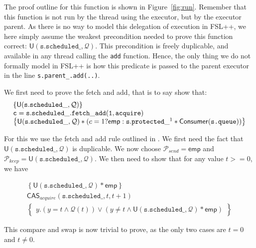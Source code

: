 The proof outline for this function is shown in Figure~\ref{fig:run}. Remember that this function is not run by the thread using the executor, but by the executor parent. As there is no way to model this delegation of execution in FSL++, we here simply assume the weakest precondition needed to prove this function correct: $\mathsf{U}(\mathtt{s.scheduled\_}, \mathcal{Q})$. This precondition is freely duplicable, and available in any thread calling the \texttt{add} function. Hence, the only thing we do not formally model in FSL++ is how this predicate is passed to the parent executor in the line \texttt{s.parent\_.add(..)}. 

We first need to prove the fetch and add, that is to say show that:
\begin{equation*}
		\begin{array}{l}
	\left\{\mathsf{U}(\mathtt{s.scheduled\_}, \mathcal{Q}) \right\} \\
		\mathtt{c = s.scheduled\_.fetch\_add(1, acquire)} \\
		\left\{\mathsf{U}(\mathtt{s.scheduled\_}, \mathcal{Q}) * (c = 1 ? \mathsf{emp} :  \mathtt{s.protected\_}^1 * \mathsf{Consumer}(\texttt{s.queue})) \right\}
\end{array}
\end{equation*}

For this we use the fetch and add rule outlined in \cite{fsl}. We first need the fact that $\mathsf{U}(\mathtt{s.scheduled\_}, \mathcal{Q})$ is duplicable. We now choose $\mathcal{P}_{send} = \mathsf{emp}$ and $\mathcal{P}_{keep} = \mathsf{U}(\mathtt{s.scheduled\_}, \mathcal{Q})$. We then need to show that for any value $t >= 0$, we have

\begin{equation*}
		\begin{array}{l}
		\left\{ \mathsf{U}(\mathtt{s.scheduled\_}, \mathcal{Q}) * \mathsf{emp}
		\right\}\\
				\mathsf{CAS}_{acquire}(\mathtt{s.scheduled\_}, t, t + 1) \\
		\left\{
				\begin{array}{l}
						y. (y = t \land \mathcal{Q}(t)) \lor (y \neq t \land \mathsf{U}(\mathtt{s.scheduled\_}, \mathcal{Q}) * \mathsf{emp})
				\end{array}
		\right\}
		\end{array}
\end{equation*}

This compare and swap is now trivial to prove, as the only two cases are $t = 0$ and $t \neq 0$.

